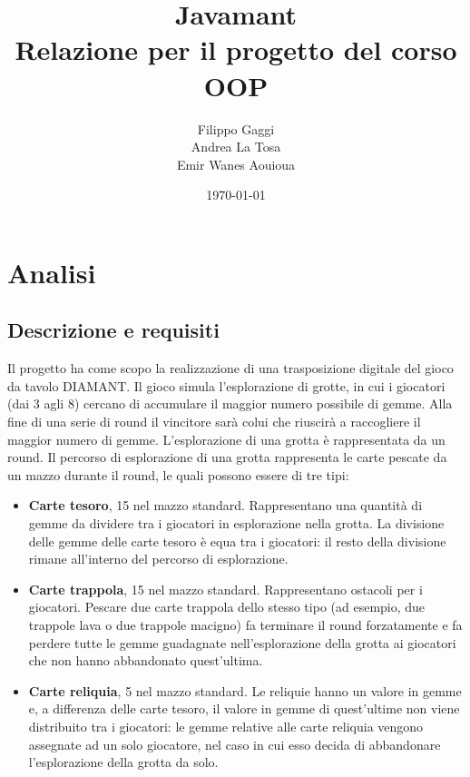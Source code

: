 \documentclass[a4paper,12pt]{report}
\title{Javamant \\ Relazione per il progetto del corso OOP}
\author{
	Filippo Gaggi
	\\ Andrea La Tosa
	\\ Emir Wanes Aouioua}
\date{\today}
\begin{document}
\maketitle

\tableofcontents

\chapter{Analisi}

\section{Descrizione e requisiti}

Il progetto ha come scopo la realizzazione di una trasposizione digitale del gioco
da tavolo DIAMANT.
Il gioco simula l'esplorazione di grotte, in cui i giocatori
(dai 3 agli 8) cercano di accumulare il maggior numero possibile di gemme.
Alla fine di una serie di round il vincitore sarà colui che riuscirà
a raccogliere il maggior numero di gemme. L'esplorazione di una grotta è rappresentata da un round.
%
Il percorso di esplorazione di una grotta rappresenta le carte pescate da un mazzo durante il round,
le quali possono essere di tre tipi:
\begin{itemize}
	\item \textbf{Carte tesoro}, 15 nel mazzo standard. Rappresentano una quantità di gemme da dividere tra i giocatori in esplorazione nella grotta.
			La divisione delle gemme delle carte tesoro è equa tra i giocatori:
			il resto della divisione rimane all'interno del percorso di esplorazione.
	\item \textbf{Carte trappola}, 15 nel mazzo standard. Rappresentano ostacoli per i giocatori. Pescare due carte trappola
	dello stesso tipo (ad esempio, due trappole lava o due trappole macigno) fa terminare il round forzatamente e fa perdere tutte le gemme guadagnate nell'esplorazione
	della grotta ai giocatori che non hanno abbandonato quest'ultima.
	\item \textbf{Carte reliquia}, 5 nel mazzo standard. Le reliquie hanno un valore in gemme e, a differenza delle carte tesoro,
		il valore in gemme di quest'ultime non viene distribuito tra i giocatori: le gemme relative alle
		carte reliquia vengono assegnate ad un solo giocatore, nel caso in cui esso decida di abbandonare
		l'esplorazione della grotta da solo.
\end{itemize}
\end{document}
